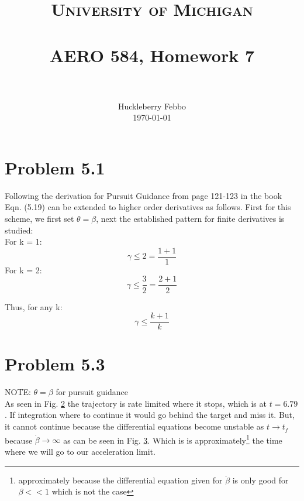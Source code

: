 \documentclass[paper=a4, fontsize=11pt]{scrartcl}
\title{
		\usefont{OT1}{bch}{b}{n}
		\normalfont \normalsize \textsc{University of Michigan} \\ [25pt]
		\horrule{0.5pt} \\[0.4cm]
		\huge AERO 584, Homework  7 \\
		\horrule{2pt} \\[0.5cm]
}
\author{
		\normalfont 								\normalsize
         Huckleberry Febbo\\[-3pt]		\normalsize
        \today
}
\date{}
\numberwithin{equation}{section}		%
\numberwithin{figure}{section}			%
\numberwithin{table}{section}				%
\begin{document}
\maketitle
\section*{Problem 5.1}

Following the derivation for Pursuit Guidance from page 121-123 in the book Eqn. (5.19) can be extended to higher order derivatives as follows. First for this scheme, we first set $\theta = \beta$, next the established pattern for finite derivatives is studied:\\
For k = 1:\\
$$\gamma \leq 2=\frac{1+1}{1}$$
For k = 2:\\
$$\gamma \leq \frac{3}{2}=\frac{2+1}{2}$$

Thus, for any k:\\
$$\gamma \leq \frac{k+1}{k}$$




\begin{figure}[!htb]
	\centering
    
	\caption{ \label{fig:f1}}
\end{figure}

\section*{Problem 5.3}
%

NOTE:  $\theta = \beta$ for pursuit guidance \\

As seen in Fig. \ref{fig:f3} the trajectory is rate limited where it stops, which is at $t=6.79$. If integration where to continue it would go behind the target and miss it. But, it cannot continue because the differential equations become unstable as $t \rightarrow t_f$ because $\dot{\beta} \rightarrow \infty$ as can be seen in Fig. \ref{fig:f3b}. Which is is approximately\footnote{ approximately because the differential equation given for $\ddot{\beta}$ is only good for $\beta << 1$ which is not the case} the time where we will go to our acceleration limit. 

\begin{figure}[!htb]
	\centering
    
	\caption{ \label{fig:f3}}
\end{figure}

\begin{figure}[!htb]
	\centering
    
	\caption{ \label{fig:f3b}}
\end{figure}
\end{document}
